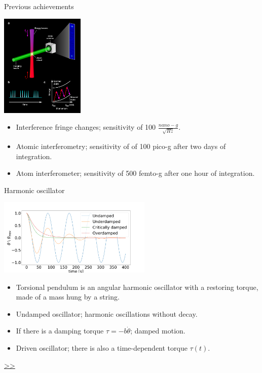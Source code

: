\documentclass{beamer}
\begin{document}
\begin{frame}{Previous achievements}
	\begin{center}		
		\includegraphics[width=0.3\textwidth,keepaspectratio]{kasevich.png}
	\end{center}
	\begin{itemize}

		\item Interference fringe changes; sensitivity of 100 $\frac{nano-g}{\sqrt{Hz}}$.
		\item Atomic interferometry; sensitivity of of 100 pico-g after two days of integration.
		\item Atom interferometer; sensitivity of 500 femto-g after one hour of integration.
		
	\end{itemize}
\end{frame}

\begin{frame}{\hypertarget{frame:Harmonic oscillator}{Harmonic oscillator}}
	\begin{center}		
		\includegraphics[width=0.55\textwidth,keepaspectratio]{damp.png}
    \end{center}
	\begin{itemize}

		\item Torsional pendulum is an angular harmonic oscillator with a restoring torque, made of a mass hung by a string. 
		\item Undamped oscillator; harmonic oscillations without decay.
		\item If there is a damping torque $\tau = -b\dot{\theta}$; damped motion.
		\item Driven oscillator; there is also a time-dependent torque $\tau(t)$.
		
	\end{itemize}
	\hyperlink{frame:Damped oscillator}{>>}
\end{frame}
\end{document}
